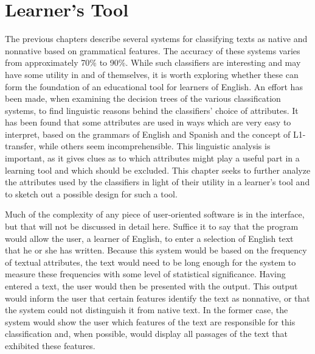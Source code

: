 \documentclass[main.tex]{subfiles}
\begin{document}
\section{Learner's Tool}
\setcounter{section}{8}

The previous chapters describe several systems for classifying texts as native and nonnative based on grammatical features. The accuracy of these systems varies from approximately 70\% to 90\%. While such classifiers are interesting and may have some utility in and of themselves, it is worth exploring whether these can form the foundation of an educational tool for learners of English. An effort has been made, when examining the decision trees of the various classification systems, to find linguistic reasons behind the classifiers' choice of attributes. It has been found that some attributes are used in ways which are very easy to interpret, based on the grammars of English and Spanish and the concept of L1-transfer, while others seem incomprehensible. This linguistic analysis is important, as it gives clues as to which attributes might play a useful part in a learning tool and which should be excluded. This chapter seeks to further analyze the attributes used by the classifiers in light of their utility in a learner's tool and to sketch out a possible design for such a tool.

Much of the complexity of any piece of user-oriented software is in the interface, but that will not be discussed in detail here. Suffice it to say that the program would allow the user, a learner of English, to enter a selection of English text that he or she has written. Because this system would be based on the frequency of textual attributes, the text would need to be long enough for the system to measure these frequencies with some level of statistical significance. Having entered a text, the user would then be presented with the output. This output would inform the user that certain features identify the text as nonnative, or that the system could not distinguish it from native text. In the former case, the system would show the user which features of the text are responsible for this classification and, when possible, would display all passages of the text that exhibited these features.
\end{document}
